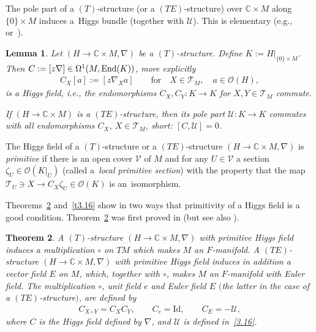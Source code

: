 \documentclass[10pt,a4paper]{amsart}
\numberwithin{equation}{section}
\numberwithin{figure}{section}
\newcommand{\C}{{\mathbb C}}
\newcommand{\OO}{{\mathcal O}}
\newcommand{\TT}{{\mathcal T}}
\newcommand{\UU}{{\mathcal U}}
\newcommand{\nnn}{\nabla}
\newtheorem{Theorem}{Theorem}[section]
\newtheorem{Lemma}[Theorem]{Lemma}
\begin{document}
The pole part of a $(T)$-structure (or a $(TE)$-structure)
over $\C\times M$ along $\{0\}\times M$ induces a~Higgs bundle (together with $\UU$).
This is elementary (e.g.,~\cite{DH20-1} or~\cite{He03}).

\begin{Lemma}\label{t3.12}
Let $(H\to\C\times M,\nnn)$ be a $(T)$-structure.
Define $K:=H|_{\{0\}\times M}$.
Then $C:=[z\nnn]\in\Omega^1(M,{\rm End}(K))$,
more explicitly
\begin{eqnarray}\label{3.21}
C_X[a]:= [z\nnn_X a]\qquad\text{for}\quad X\in \TT_M,\quad a\in\OO(H),
\end{eqnarray}
is a Higgs field, i.e., the endomorphisms $C_X,C_Y\colon K\to K$
for $X,Y\in\TT_M$ commute.

If $(H\to\C\times M)$ is a $(TE)$-structure,
then its pole part $\UU\colon K\to K$ commutes with all
endomorphisms $C_X$, $X\in\TT_M$, short: $[C,\UU]=0$.
\end{Lemma}


\begin{Definition}\label{t3.13}
The Higgs field of a $(T)$-structure or a $(TE)$-structure
$(H\to\C\times M,\nnn)$ is {\it primitive}
if there is an open cover $\mathcal V$ of $M$ and for any
$U\in \mathcal V$
a section $\zeta_{U}\in {\mathcal O} (K\vert_{U})$
(called a~{\it local primitive section})
with the property that the map
$\TT_U\ni X\rightarrow C_{X} \zeta_{U} \in \OO(K)$
is an~isomorphism.
\end{Definition}

Theorems~\ref{t3.14} and~\ref{t3.16} show in two ways
that primitivity of a Higgs field is a good condition.
Theorem~\ref{t3.14} was first proved in
\cite[Theorem~3.3]{HHP10} (but see also
\cite[Lemma~10]{DH20-1}).

\begin{Theorem}\label{t3.14}
A $(T)$-structure $(H\rightarrow \mathbb{C}\times M, \nabla )$
with primitive Higgs field induces a multiplication $\circ$
on $TM$ which makes $M$ an $F$-manifold.
A $(TE)$-structure $(H\rightarrow \mathbb{C}\times M, \nabla )$
with primitive Higgs field induces in addition
a vector field $E$ on $M$, which, together with $\circ$,
makes $M$ an $F$-manifold with Euler field.
The multiplication $\circ$, unit field $e$ and Euler field $E$
$($the latter in the case of a $(TE)$-structure$)$, are defined by
\begin{gather*}%
C_{X\circ Y} = C_{X} C_{Y},\qquad
C_{e} =\mathrm{Id},\qquad
C_{E} = - {\mathcal U},
\end{gather*}
where $C$ is the Higgs field defined by $\nabla$, and
$\mathcal U$ is defined in~\eqref{3.16}.
\end{Theorem}
\end{document}
